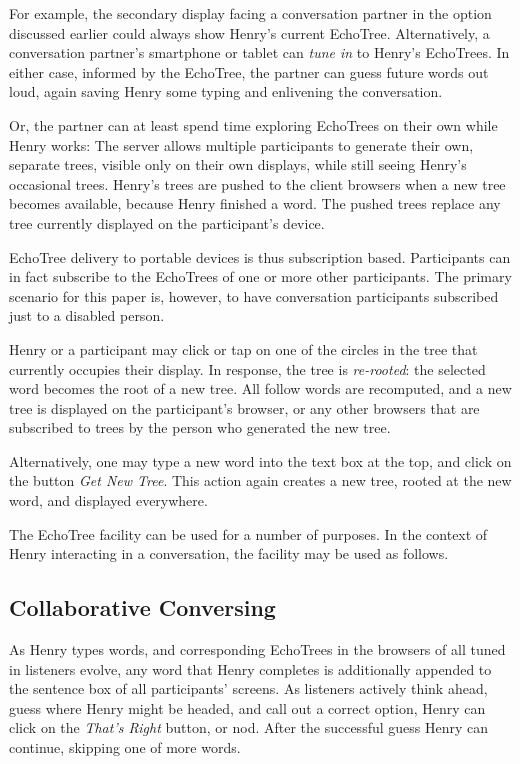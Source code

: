 \documentclass{sigchi}
\begin{document}
For example, the secondary display facing a conversation partner in
the option discussed earlier could always show Henry's current
EchoTree. Alternatively, a conversation partner's smartphone or tablet
can {\em tune in} to Henry's EchoTrees. In either case, informed by the
EchoTree, the partner can guess future words out loud, again saving
Henry some typing and enlivening the conversation. 

Or, the partner can at least spend time exploring EchoTrees on their
own while Henry works: The server allows multiple participants to
generate their own, separate trees, visible only on their own
displays, while still seeing Henry's occasional trees. Henry's trees
are pushed to the client browsers when a new tree becomes available,
because Henry finished a word. The pushed trees replace any tree
currently displayed on the participant's device.

EchoTree delivery to portable devices is thus subscription
based. Participants can in fact subscribe to the EchoTrees of one or
more other participants. The primary scenario for this paper is,
however, to have conversation participants subscribed just to a
disabled person.

Henry or a participant may click or tap on one of the circles in the
tree that currently occupies their display. In response, the tree is
{\em re-rooted}: the selected word becomes the root of a new tree. All
follow words are recomputed, and a new tree is displayed on the
participant's browser, or any other browsers that are subscribed to
trees by the person who generated the new tree.

Alternatively, one may type a new word into the text box at the top,
and click on the button {\em Get New Tree}. This action again creates
a new tree, rooted at the new word, and displayed everywhere.

The EchoTree facility can be used for a number of purposes. In the
context of Henry interacting in a conversation, the facility may be
used as follows. 

\subsection{Collaborative Conversing}
As Henry types words, and corresponding EchoTrees in the browsers of
all tuned in listeners evolve, any word that Henry completes is
additionally appended to the sentence box of all participants'
screens. As listeners actively think ahead, guess where Henry might be
headed, and call out a correct option, Henry can click on the {\em
  That's Right} button, or nod. After the successful guess Henry can
continue, skipping one of more words.
\end{document}
